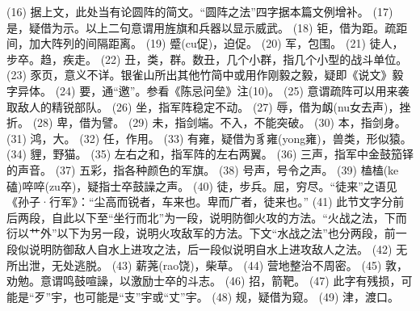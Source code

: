 \documentclass[12pt,UTF8]{ctexbook}
\begin{document}
(16) 据上文，此处当有论圆阵的简文。“圆阵之法”四字据本篇文例增补。
(17) 是，疑借为示。以上二句意谓用旌旗和兵器以显示威武。
(18) 钜，借为距。疏距间，加大阵列的间隔距离。
(19) 蹙(cu促)，迫促。
(20) 军，包围。
(21) 徒人，步卒。趋，疾走。
(22) 丑，类，群。数丑，几个小群，指几个小型的战斗单位。
(23) {豕页}，意义不详。银雀山所出其他竹简中或用作刚毅之毅，疑即《说文》毅字异体。
(24) 要，通“邀”。参看《陈忌问垒》注(10)。
(25) 意谓疏阵可以用来袭取敌人的精锐部队。
(26) 坐，指军阵稳定不动。
(27) 辱，借为衂(nu女去声)，挫折。
(28) 卑，借为譬。
(29) 未，指剑端。不入，不能突破。
(30) 本，指剑身。
(31) 鸿，大。
(32) 任，作用。
(33) {有雍}，疑借为{豸雍}(yong雍)，兽类，形似猿。
(34) 貍，野猫。
(35) 左右之和，指军阵的左右两翼。
(36) 三声，指军中金鼓笳铎的声音。
(37) 五彩，指各种颜色的军旗。
(38) 号声，号令之声。
(39) 榼榼(ke磕)啐啐(zu卒)，疑指士卒鼓譟之声。
(40) 徒，步兵。屈，穷尽。“徒来”之语见《孙子·行军》：“尘高而锐者，车来也。卑而广者，徒来也。”
(41) 此节文字分前后两段，自此以下至“坐行而北”为一段，说明防御火攻的方法。“火战之法，下而衍以{艹外}”以下为另一段，说明火攻敌军的方法。下文“水战之法”也分两段，前一段似说明防御敌人自水上进攻之法，后一段似说明自水上进攻敌人之法。
(42) 无所出泄，无处逃脱。
(43) 薪荛(rao饶)，柴草。
(44) 营地整治不周密。
(45) 敦，劝勉。意谓鸣鼓喧譟，以激励士卒的斗志。
(46) 招，箭靶。
(47) 此字有残损，可能是“歹”宇，也可能是“支”宇或“丈”宇。
(48) 规，疑借为窥。
(49) 津，渡口。
\end{document}
